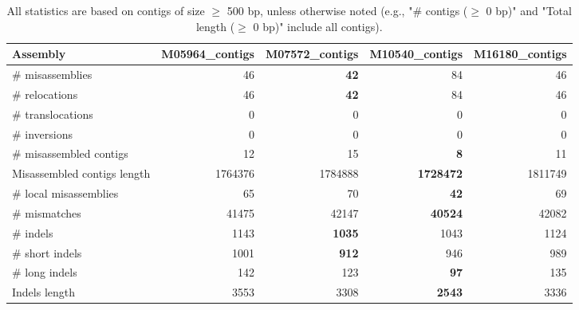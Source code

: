 \documentclass[12pt,a4paper]{article}
\begin{document}
\begin{table}[ht]
\begin{center}
\caption{All statistics are based on contigs of size $\geq$ 500 bp, unless otherwise noted (e.g., "\# contigs ($\geq$ 0 bp)" and "Total length ($\geq$ 0 bp)" include all contigs).}
\begin{tabular}{|l*{4}{|r}|}
\hline
Assembly & M05964\_contigs & M07572\_contigs & M10540\_contigs & M16180\_contigs \\ \hline
\# misassemblies & 46 & {\bf 42} & 84 & 46 \\ \hline
\hspace{5mm}\# relocations & 46 & {\bf 42} & 84 & 46 \\ \hline
\hspace{5mm}\# translocations & 0 & 0 & 0 & 0 \\ \hline
\hspace{5mm}\# inversions & 0 & 0 & 0 & 0 \\ \hline
\# misassembled contigs & 12 & 15 & {\bf 8} & 11 \\ \hline
Misassembled contigs length & 1764376 & 1784888 & {\bf 1728472} & 1811749 \\ \hline
\# local misassemblies & 65 & 70 & {\bf 42} & 69 \\ \hline
\# mismatches & 41475 & 42147 & {\bf 40524} & 42082 \\ \hline
\# indels & 1143 & {\bf 1035} & 1043 & 1124 \\ \hline
\hspace{5mm}\# short indels & 1001 & {\bf 912} & 946 & 989 \\ \hline
\hspace{5mm}\# long indels & 142 & 123 & {\bf 97} & 135 \\ \hline
Indels length & 3553 & 3308 & {\bf 2543} & 3336 \\ \hline
\end{tabular}
\end{center}
\end{table}
\end{document}

